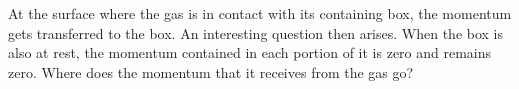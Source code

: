 \documentclass[a4paper,12pt,%
onecolumn,oneside,titlepage,%
british%
]{memoir}
\renewcommand*{\|}[1][]{\nonscript\:#1\vert\nonscript\:\mathopen{}}
\begin{document}
At the surface where the gas is in contact with its containing box, the momentum gets transferred to the box. An interesting question then arises. When the box is also at rest, the momentum contained in each portion of it is zero and remains zero. Where does the momentum that it receives from the gas go?
%
%
\end{document}
